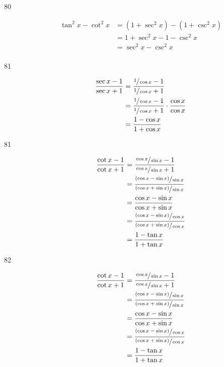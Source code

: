 \documentclass{exam}
\begin{document}
\begin{description}
      \item[80] 
        \begin{align*}
          \tan^2 x - \cot^2 x & = \left( 1 + \sec^2 x \right) - \left( 1 + \csc^2 x \right) \\
                              & = 1 + \sec^2 x - 1 - \csc^2 x \\
                              & = \sec^2 x - \csc^2 x \\
        \end{align*}

      \item[81] 
        \begin{align*}
          \frac{\sec x - 1}{\sec x + 1} & = \frac{\sfrac{1}{\cos x} - 1}{\sfrac{1}{\cos x} + 1} \\
                                        & = \frac{\sfrac{1}{\cos x} - 1}{\sfrac{1}{\cos x} + 1} \cdot \frac{\cos x}{\cos x} \\
                                        & = \frac{1 - \cos x}{1 + \cos x} \\
        \end{align*}

      \item[81] 
        \begin{align*}
          \frac{\cot x - 1}{\cot x + 1} & = \frac{\sfrac{\cos x}{\sin x} - 1}{\sfrac{\cos x}{\sin x} + 1} \\
                                        & = \frac{\sfrac{( \cos x - \sin x )}{\sin x}}{\sfrac{( \cos x + \sin x )}{\sin x}} \\
                                        & = \frac{\cos x - \sin x}{\cos x + \sin x} \\
                                        & = \frac{\sfrac{( \cos x - \sin x )}{\cos x}}{\sfrac{( \cos x + \sin x )}{\cos x}} \\
                                        & = \frac{1 - \tan x}{1 + \tan x} \\
        \end{align*}

      \item[82] 
        \begin{align*}
          \frac{\cot x - 1}{\cot x + 1} & = \frac{\sfrac{\cos x}{\sin x} - 1}{\sfrac{\cos x}{\sin x} + 1} \\
                                        & = \frac{\sfrac{( \cos x - \sin x )}{\sin x}}{\sfrac{( \cos x + \sin x )}{\sin x}} \\
                                        & = \frac{\cos x - \sin x}{\cos x + \sin x} \\
                                        & = \frac{\sfrac{( \cos x - \sin x )}{\cos x}}{\sfrac{( \cos x + \sin x )}{\cos x}} \\
                                        & = \frac{1 - \tan x}{1 + \tan x} \\
        \end{align*}


\end{description}
\end{document}
